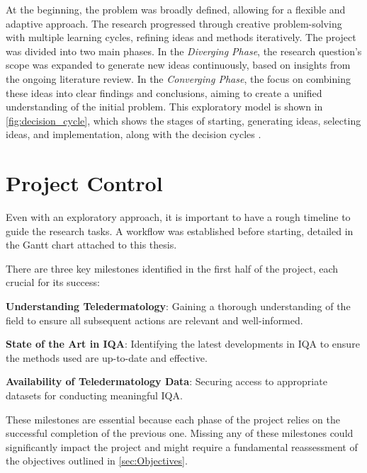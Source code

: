 \vspace{\baselineskip}
\noindent
At the beginning, the problem was broadly defined, allowing for a flexible and adaptive approach. The research progressed through creative problem-solving with multiple learning cycles, refining ideas and methods iteratively. The project was divided into two main phases. In the \textit{Diverging Phase}, the research question’s scope was expanded to generate new ideas continuously, based on insights from the ongoing literature review. In the \textit{Converging Phase}, the focus on combining these ideas into clear findings and conclusions, aiming to create a unified understanding of the initial problem. This exploratory model is shown in \autoref{fig:decision_cycle}, which shows the stages of starting, generating ideas, selecting ideas, and implementation, along with the decision cycles \autocite{DesignThinking}.

\section{Project Control}
\label{sec:ProjectMonitoring}
Even with an exploratory approach, it is important to have a rough timeline to guide the research tasks. A workflow was established before starting, detailed in the Gantt chart attached to this thesis. \par
\vspace{\baselineskip}
\noindent
There are three key milestones identified in the first half of the project, each crucial for its success: \par
\vspace{\baselineskip}
\noindent
\textbf{Understanding Teledermatology}: Gaining a thorough understanding of the field to ensure all subsequent actions are relevant and well-informed. \par
\vspace{\baselineskip}
\noindent
\textbf{State of the Art in IQA}: Identifying the latest developments in IQA to ensure the methods used are up-to-date and effective. \par
\vspace{\baselineskip}
\noindent
\textbf{Availability of Teledermatology Data}:  Securing access to appropriate datasets for conducting meaningful IQA. \par
\vspace{\baselineskip}
\noindent
These milestones are essential because each phase of the project relies on the successful completion of the previous one. Missing any of these milestones could significantly impact the project and might require a fundamental reassessment of the objectives outlined in \autoref{sec:Objectives}. \par

